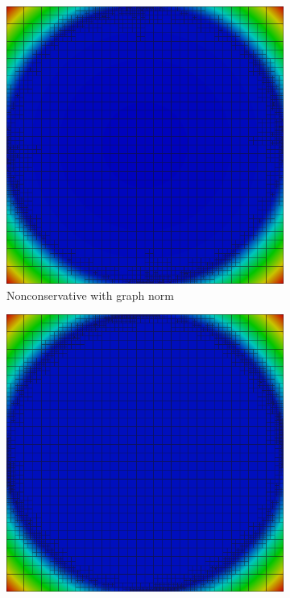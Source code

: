 \documentclass[letterpaper]{article}
\begin{document}
\begin{figure}
\centering
\begin{subfigure}[t]{0.45\textwidth}
\centering
\includegraphics[width=\textwidth]{figs/Vortex/graph6nc.png}
\caption{Nonconservative with graph norm}
\label{fig:vortexGraph6nc}
\end{subfigure}
\begin{subfigure}[t]{0.45\textwidth}
\centering
\includegraphics[width=\textwidth]{figs/Vortex/robust6nc.png}

\end{subfigure}
\end{figure}
\end{document}
